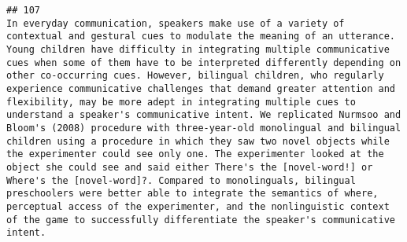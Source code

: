 \documentclass[
  english,
  man]{apa6}
\begin{document}
\begin{verbatim}
## 107                                                                                                                                                                                                                                                                                                                                                                                                                                                                                                                                                                                                                                                                                                                                                                                                                                                                                                                                                                                                                                                                                                                                                                                                                                                                                                                                                                                                                                                                                                                                    In everyday communication, speakers make use of a variety of contextual and gestural cues to modulate the meaning of an utterance. Young children have difficulty in integrating multiple communicative cues when some of them have to be interpreted differently depending on other co-occurring cues. However, bilingual children, who regularly experience communicative challenges that demand greater attention and flexibility, may be more adept in integrating multiple cues to understand a speaker's communicative intent. We replicated Nurmsoo and Bloom's (2008) procedure with three-year-old monolingual and bilingual children using a procedure in which they saw two novel objects while the experimenter could see only one. The experimenter looked at the object she could see and said either There's the [novel-word!] or Where's the [novel-word]?. Compared to monolinguals, bilingual preschoolers were better able to integrate the semantics of where, perceptual access of the experimenter, and the nonlinguistic context of the game to successfully differentiate the speaker's communicative intent.

\end{verbatim}
\end{document}
